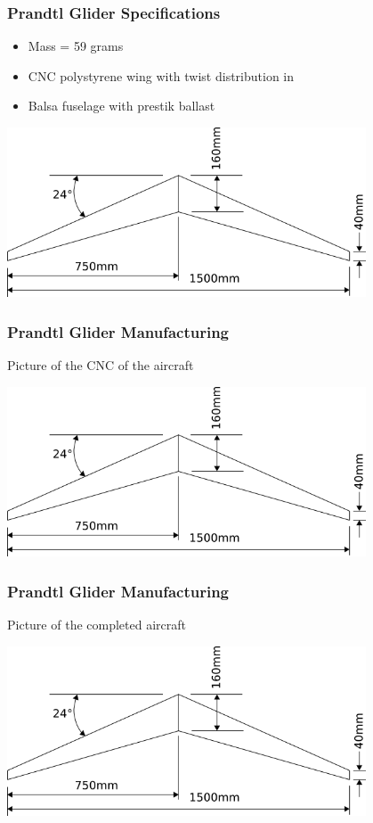 \documentclass{beamer}
\begin{document}
\begin{frame}
\frametitle{Prandtl Glider Specifications}

\begin{itemize}
\item Mass = 59 grams
\item CNC polystyrene wing with twist distribution in \cite{PrandtlBowers}
\item Balsa fuselage with prestik ballast
\end{itemize}

\includegraphics[width = 0.8\textwidth]{Pictures/P1Planform.png}

\end{frame}


\begin{frame}
\frametitle{Prandtl Glider Manufacturing}

Picture of the CNC of the aircraft

\includegraphics[width = 0.8\textwidth]{Pictures/P1Planform.png}

\end{frame}


\begin{frame}
\frametitle{Prandtl Glider Manufacturing}

Picture of the completed aircraft

\includegraphics[width = 0.8\textwidth]{Pictures/P1Planform.png}

\end{frame}
\end{document}
